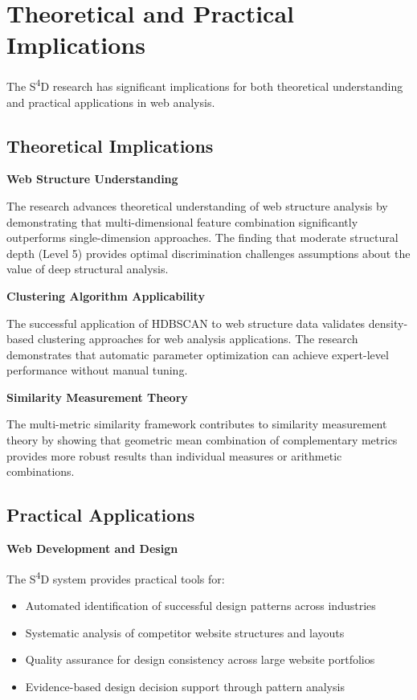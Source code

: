 \section{Theoretical and Practical Implications}
\label{sec:implications}

The S\textsuperscript{4}D research has significant implications for both theoretical understanding and practical applications in web analysis.

\subsection{Theoretical Implications}
\label{subsec:theoretical-implications}

\textbf{Web Structure Understanding}

The research advances theoretical understanding of web structure analysis by demonstrating that multi-dimensional feature combination significantly outperforms single-dimension approaches. The finding that moderate structural depth (Level 5) provides optimal discrimination challenges assumptions about the value of deep structural analysis.

\textbf{Clustering Algorithm Applicability}

The successful application of HDBSCAN to web structure data validates density-based clustering approaches for web analysis applications. The research demonstrates that automatic parameter optimization can achieve expert-level performance without manual tuning.

\textbf{Similarity Measurement Theory}

The multi-metric similarity framework contributes to similarity measurement theory by showing that geometric mean combination of complementary metrics provides more robust results than individual measures or arithmetic combinations.

\subsection{Practical Applications}
\label{subsec:practical-applications}

\textbf{Web Development and Design}

The S\textsuperscript{4}D system provides practical tools for:
\begin{itemize}
    \item Automated identification of successful design patterns across industries
    \item Systematic analysis of competitor website structures and layouts
    \item Quality assurance for design consistency across large website portfolios
    \item Evidence-based design decision support through pattern analysis
\end{itemize}


